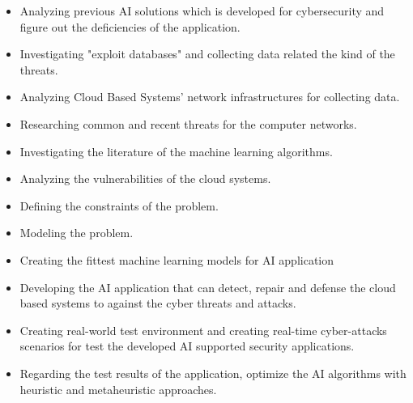 \begin{itemize}
    \item {
        Analyzing previous AI solutions which is developed for cybersecurity and figure out the deficiencies of the application. 
     }
    
     \item{
        Investigating "exploit databases" and collecting data related the kind of the threats.  
     }
     \item {
        Analyzing Cloud Based Systems' network infrastructures for collecting data. 
     }
    
     \item {
        Researching common and recent threats for the computer networks.
     }

     \item {
        Investigating the literature of the machine learning algorithms. 
    }
    \item {
        Analyzing the vulnerabilities of the cloud systems.   
    }

     \item {
        Defining the constraints of the problem.
     }

     \item {
        Modeling the problem. 
     }
     \item {
        Creating the fittest machine learning models for AI application 
     }
     \item {
        Developing the AI application that can detect, repair and defense the cloud based systems to against the cyber threats and attacks.
     }
    \item {
        Creating real-world test environment and creating real-time cyber-attacks scenarios for test the developed AI supported security applications.
    }

    \item {
        Regarding the test results of the application, optimize the AI algorithms with heuristic and metaheuristic approaches.  
    }

\end{itemize} 